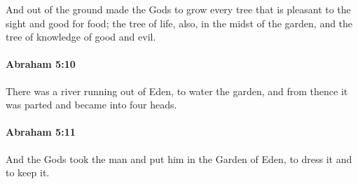 			And out of the ground made the Gods to grow every tree that is pleasant to the sight and good for food; the tree of life, also, in the midst of the garden, and the tree of knowledge of good and evil.


		\paragraph{Abraham 5:10} %
			\label{ABRAHAM-5-10}

			There was a river running out of Eden, to water the garden, and from thence it was parted and became into four heads.


		\paragraph{Abraham 5:11} %
			\label{ABRAHAM-5-11}

			And the Gods took the man and put him in the Garden of Eden, to dress it and to keep it.

